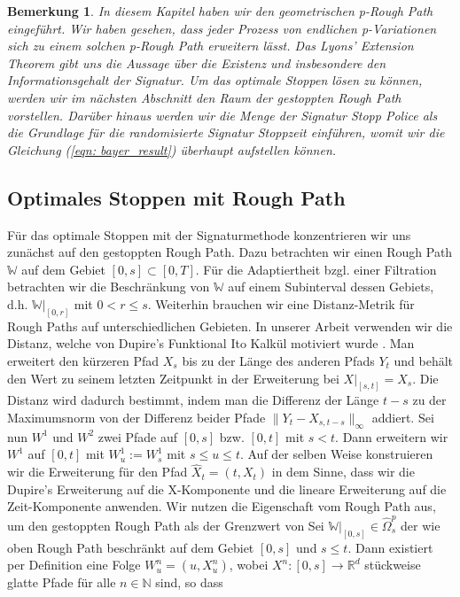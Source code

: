\documentclass[12pt,titlepage,headsepline]{article}
\newtheorem*{bemerkung*}{Bemerkung}
\begin{document}
      \begin{bemerkung*}
        \textup{
        In diesem Kapitel haben wir den geometrischen p-Rough Path eingeführt. Wir haben gesehen, dass jeder Prozess von endlichen p-Variationen sich zu einem solchen p-Rough Path erweitern lässt. Das Lyons' Extension Theorem gibt uns die Aussage über die Existenz und insbesondere den Informationsgehalt der Signatur. Um das optimale Stoppen lösen zu können, werden wir im nächsten Abschnitt den Raum der gestoppten Rough Path vorstellen. Darüber hinaus werden wir die Menge der Signatur Stopp Police als die Grundlage für die randomisierte Signatur Stoppzeit einführen, womit wir die Gleichung (\ref{eqn: bayer_result}) überhaupt aufstellen können.
        }
      \end{bemerkung*}
      \newpage

      \subsection{Optimales Stoppen mit Rough Path}\label{stopped_rough_path: chapter}
      Für das optimale Stoppen mit der Signaturmethode konzentrieren wir uns zunächst auf den gestoppten Rough Path. Dazu betrachten wir einen Rough Path $\mathbb{W}$ auf dem Gebiet $[0,s] \subset [0,T]$. Für die Adaptiertheit bzgl. einer Filtration betrachten wir die Beschränkung von $\mathbb{W}$ auf einem Subinterval dessen Gebiets, d.h. $\mathbb{W}\rvert_{[0,r]}$ mit $0<r\leq s$. Weiterhin brauchen wir eine Distanz-Metrik für Rough Paths auf unterschiedlichen Gebieten. In unserer Arbeit verwenden wir die Distanz, welche von Dupire's Funktional Ito Kalkül motiviert wurde \cite{cont_functional_2010, dupire_functional_2009}. Man erweitert den kürzeren Pfad $X_s$ bis zu der Länge des anderen Pfads $Y_t$ und behält den Wert zu seinem letzten Zeitpunkt in der Erweiterung bei $X\rvert_{[s,t]}=X_s$. Die Distanz wird dadurch bestimmt, indem man die Differenz der Länge $t-s$ zu der Maximumsnorm von der Differenz beider Pfade $\lVert Y_t - X_{s,t-s}\rVert_{\infty}$ addiert.
      \hfill\break
      Sei nun $W^1$ und $W^2$ zwei Pfade auf $[0,s]$ bzw. $[0,t]$ mit $s<t$. Dann erweitern wir $W^1$ auf $[0,t]$
      mit $W^1_u:=W^1_s$ mit $s \leq u \leq t $. Auf der selben Weise konstruieren wir die Erweiterung für den Pfad $\hat{X}_t = (t,X_t)$ in dem Sinne, dass wir die Dupire's Erweiterung auf die X-Komponente und die lineare Erweiterung auf die Zeit-Komponente anwenden.
      \hfill\break
      Wir nutzen die Eigenschaft vom Rough Path aus, um den gestoppten Rough Path als der Grenzwert von Sei $\mathbb{W}\rvert_{[0,s]} \in \hat{\Omega}_s^p$ der wie oben Rough Path beschränkt auf dem Gebiet $[0,s]$ und $s \leq t$. Dann existiert per Definition eine Folge $W_u^n =(u,X_u^n)$, wobei $X^n:[0,s] \rightarrow \mathbb{R}^d$ stückweise glatte Pfade für alle $n \in \mathbb{N}$ sind, so dass
\end{document}
